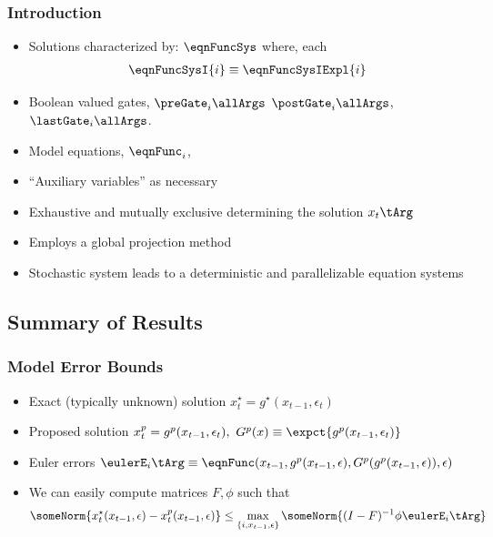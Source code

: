 \documentclass[notheorems]{beamer}
\begin{document}
\begin{frame}
  \frametitle{Introduction}
{\small
\begin{itemize}
\item Solutions characterized by: $\eqnFuncSys$  where, each 
\begin{gather}
\eqnFuncSysI{i}\equiv \eqnFuncSysIExpl{i} \label{eqnGates}
\end{gather}
\item Boolean valued gates, $\preGate_i\allArgs$ $\postGate_i\allArgs$,
$\lastGate_i\allArgs$. 
\item Model equations, $\eqnFunc_i$,  
\item ``Auxiliary variables'' as necessary
\item Exhaustive and mutually exclusive determining the solution  $x_t\tArg$
\item Employs a global projection method
\item Stochastic system leads to a deterministic and parallelizable equation systems
\end{itemize}
}
\end{frame}

\subsection{Summary of Results}
\label{sec:summary-results}




\begin{frame}
  \frametitle{Model Error Bounds}
  \begin{itemize}
  \item Exact (typically unknown) solution $x^\star_t=g^\star(x_{t-1},\epsilon_t)$ 
  \item Proposed solution  $x^p_t=g^p(x_{t-1},\epsilon_t), \,\,G^p(x)\equiv \expct{g^p(x_{t-1},\epsilon_t)}$ 
 \item Euler errors $\eulerE_i\tArg \equiv  \eqnFunc(x_{t-1},g^p(x_{t-1},\epsilon),G^p(g^p(x_{t-1},\epsilon)),\epsilon)$
 \item We can easily compute matrices  $F, \phi $ such that 
 {\small   \begin{gather*}
 \someNorm{ x^\star_{t}(x_{t-1},\epsilon) -	 x^p_{t}(x_{t-1},\epsilon)} \le 
 \max_{\{i,x_{t-1},\epsilon\}} \someNorm{(I-F)^{-1} \phi \eulerE_i\tArg }
    \end{gather*}}
  \end{itemize}
\end{frame}
\end{document}
